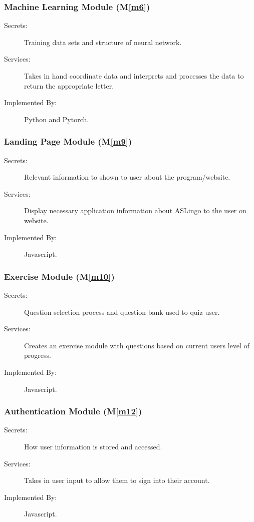 \documentclass[12pt, titlepage]{article}
\newcommand{\mref}[1]{M\ref{#1}}
\begin{document}
\subsubsection{Machine Learning Module (\mref{m6})}
\begin{description}
\item[Secrets:] Training data sets and structure of neural network.
\item[Services:] Takes in hand coordinate data and interprets and processes the data to return the appropriate letter.
\item[Implemented By:] Python and Pytorch.
\end{description}

\subsubsection{Landing Page Module (\mref{m9})}
\begin{description}
\item[Secrets:] Relevant information to shown to user about the program/website.
\item[Services:] Display necessary application information about ASLingo to the user on website.
\item[Implemented By:] Javascript.
\end{description}

\subsubsection{Exercise Module (\mref{m10})}
\begin{description}
\item[Secrets:] Question selection process and question bank used to quiz user.
\item[Services:] Creates an exercise module with questions based on current users level of progress.
\item[Implemented By:] Javascript.
\end{description}

\subsubsection{Authentication Module (\mref{m12})}
\begin{description}
\item[Secrets:] How user information is stored and accessed.
\item[Services:] Takes in user input to allow them to sign into their account.
\item[Implemented By:] Javascript.
\end{description}
\end{document}
